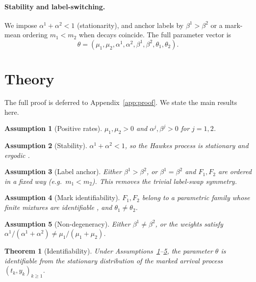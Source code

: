 \documentclass[11pt]{article}
\newtheorem{theorem}{Theorem}
\newtheorem{assumption}{Assumption}
\theoremstyle{remark}
\begin{document}
\paragraph{Stability and label-switching.} We impose $\alpha^1 + \alpha^2 < 1$ (stationarity), and anchor labels by $\beta^1 > \beta^2$ or a mark-mean ordering $m_1 < m_2$ when decays coincide. The full parameter vector is
\[
\theta = (\mu_1, \mu_2, \alpha^1, \alpha^2, \beta^1, \beta^2, \theta_1, \theta_2).
\]

\section{Theory}
\label{sec:theory}

The full proof is deferred to Appendix~\ref{app:proof}. We state the main results here.

\begin{assumption}[Positive rates]\label{a:positive} $\mu_1, \mu_2 > 0$ and $\alpha^j, \beta^j > 0$ for $j=1,2$.\end{assumption}
\begin{assumption}[Stability]\label{a:stability} $\alpha^1 + \alpha^2 < 1$, so the Hawkes process is stationary and ergodic \citep{gao2018consistency}.\end{assumption}
\begin{assumption}[Label anchor]\label{a:label} Either $\beta^1 > \beta^2$, or $\beta^1 = \beta^2$ and $F_1, F_2$ are ordered in a fixed way (e.g.~$m_1 < m_2$). This removes the trivial label-swap symmetry.\end{assumption}
\begin{assumption}[Mark identifiability]\label{a:marks} $F_1, F_2$ belong to a parametric family whose finite mixtures are identifiable \citep{teicher1961mixtures,teicher1963finite}, and $\theta_1 \ne \theta_2$.\end{assumption}
\begin{assumption}[Non-degeneracy]\label{a:nondeg} Either $\beta^1 \ne \beta^2$, or the weights satisfy $\alpha^1/(\alpha^1+\alpha^2) \ne \mu_1/(\mu_1+\mu_2)$.\end{assumption}

\begin{theorem}[Identifiability]\label{thm:id}
Under Assumptions~\ref{a:positive}--\ref{a:nondeg}, the parameter $\theta$ is identifiable from the stationary distribution of the marked arrival process $(t_k, y_k)_{k \ge 1}$.
\end{theorem}
\end{document}
